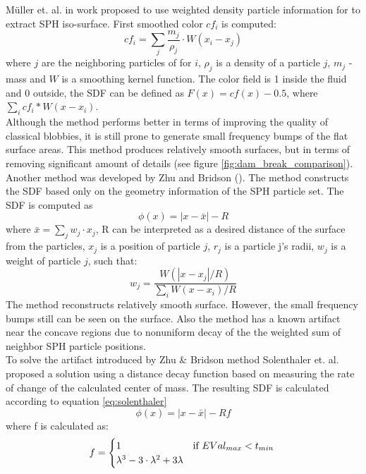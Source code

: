 Müller et. al. in work \cite{Muller} proposed to use weighted density particle information for to extract SPH iso-surface. First smoothed color $cf_i$ is computed:
\begin{equation}
	cf_i = \sum_j{\dfrac{m_j}{\rho_j} \cdot W(x_i - x_j)}
\end{equation}
where $j$ are the neighboring particles of for $i$, $\rho_j$ is a density of a particle $j$, $m_j$ - mass and $W$ is a smoothing kernel function. The color field is 1 inside the fluid and 0 outside, the SDF can be defined as $F(x) = cf(x) - 0.5$, where $\sum_i cf_i * W(x - x_i)$.\\
Although the method performs better in terms of improving the quality of classical blobbies, it is still prone to generate small frequency bumps of the flat surface areas. This method produces relatively smooth surfaces, but in terms of removing significant amount of details (see figure \ref{fig:dam_break_comparison}).\\
Another method was developed by Zhu and Bridson (\cite{ZhuBridson}). The method constructs the SDF based only on the geometry information of the SPH particle set. The SDF is computed as 
\begin{equation}
	\phi(x) = |x - \bar{x}| - R
\end{equation}
where $\bar{x} = \sum_j{w_j \cdot x_j}$, R can be interpreted as a desired distance of the
surface from the particles, $x_j$ is a position of particle $j$, $r_j$ is a particle j's radii, $w_j$ is a weight of particle $j$, such that:
\begin{equation}
	w_j = \dfrac{W(|x - x_j|/R)}{\sum_i{W(x - x_i)/R}}
\end{equation}
The method reconstructs relatively smooth surface. However, the small frequency bumps still can be seen on the surface. Also the method has a known artifact near the concave regions due to nonuniform decay of the the weighted sum of neighbor SPH particle positions.\\
To solve the artifact introduced by Zhu \& Bridson method Solenthaler et. al. \cite{Solenthaler} proposed a solution using a distance decay function based on measuring the rate of change of the calculated center of  mass. The resulting SDF is calculated according to equation \ref{eq:solenthaler}
\begin{equation}
	\phi(x) = |x - \bar{x}| - Rf
	\label{eq:solenthaler}
\end{equation}
where f is calculated as:
\begin{equation}
	f = 
	\begin{cases}
		1 & \text{if $EVal_{max} < t_{min}$}\\
		\lambda^3 -3\cdot\lambda^2 + 3\lambda
	\end{cases}\\
\end{equation}
